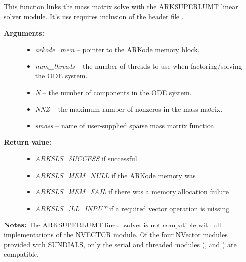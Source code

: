 \documentclass[letterpaper,10pt,english]{sphinxmanual}
\begin{document}

\begin{fulllineitems}
\label{c_interface/User_callable:c.ARKMassSuperLUMT}
This function links the mass matrix solve with the ARKSUPERLUMT
linear solver module.  It's use requires inclusion of the header
file .
\begin{description}
\item[{\textbf{Arguments:}}] \leavevmode\begin{itemize}
\item {} 
\emph{arkode\_mem} -- pointer to the ARKode memory block.

\item {} 
\emph{num\_threads} -- the number of threads to use when
factoring/solving the ODE system.

\item {} 
\emph{N} -- the number of components in the ODE system.

\item {} 
\emph{NNZ} -- the maximum number of nonzeros in the mass matrix.

\item {} 
\emph{smass} -- name of user-supplied sparse mass matrix function.

\end{itemize}

\item[{\textbf{Return value:}}] \leavevmode\begin{itemize}
\item {} 
\emph{ARKSLS\_SUCCESS}   if successful

\item {} 
\emph{ARKSLS\_MEM\_NULL}  if the ARKode memory was 

\item {} 
\emph{ARKSLS\_MEM\_FAIL}  if there was a memory allocation failure

\item {} 
\emph{ARKSLS\_ILL\_INPUT} if a required vector operation is missing

\end{itemize}

\end{description}

\textbf{Notes:}  The ARKSUPERLUMT linear solver is not compatible with all
implementations of the NVECTOR module. Of the four NVector
modules provided with SUNDIALS, only the serial and threaded
modules ({\hyperref[nvectors/NVector_Serial:nvectors-nvserial]{\emph{}}}, {\hyperref[nvectors/NVector_OpenMP:nvectors-openmp]{\emph{}}} and
{\hyperref[nvectors/NVector_Pthreads:nvectors-pthreads]{\emph{}}}) are compatible.

\end{fulllineitems}
\end{document}
